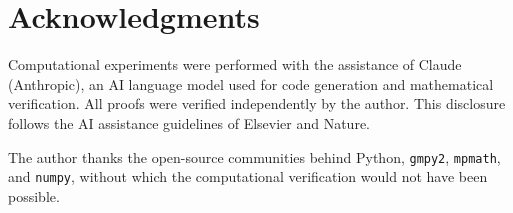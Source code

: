 \documentclass[12pt]{amsart}
\theoremstyle{definition}
\theoremstyle{remark}
\begin{document}
\section*{Acknowledgments}

Computational experiments were performed with the assistance of Claude
(Anthropic), an AI language model used for code generation and
mathematical verification.  All proofs were verified independently by the
author.  This disclosure follows the AI assistance guidelines of
Elsevier and Nature.

The author thanks the open-source communities behind Python,
\texttt{gmpy2}, \texttt{mpmath}, and \texttt{numpy}, without which the
computational verification would not have been possible.


\end{document}
